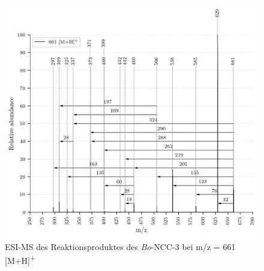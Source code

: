 \begin{figure}[!htbp]
  \centering
  \includegraphics[width=\textwidth, height=0.7\textwidth]{figures/Kapitel7/Kataboliten/VWA_MS_661.png}
  \caption[ESI-MS des Reaktionsproduktes des \textit{Bo}-NCC-3, Quelle: Author]{ESI-MS des Reaktionsproduktes des \textit{Bo}-NCC-3 bei m/z = 661 [M+H]\textsuperscript{+}}
  \label{fig:661MH}
\end{figure}

